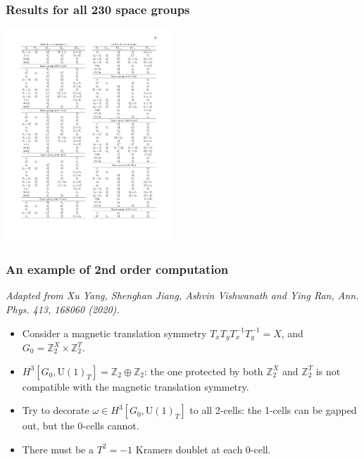 \documentclass[xcolor=table, 11pt, aspectratio=169]{beamer}
\newcommand{\uone}{\mathrm U(1)}
\begin{document}
  \begin{frame}
    \frametitle{Results for all 230 space groups}
    \begin{center}
      \includegraphics[height=8cm]{bigtable}
    \end{center}
  \end{frame}
  
  \begin{frame}
  \frametitle{An example of 2nd order computation}
  \emph{\small Adapted from Xu Yang, Shenghan Jiang, Ashvin Vishwanath and Ying Ran, Ann. Phys. 413, 168060 (2020).}
  \begin{itemize}
    \item Consider a magnetic translation symmetry $T_xT_yT_x^{-1}T_y^{-1} = X$, and $G_0=\mathbb Z_2^X\times\mathbb Z_2^T$.
    \item $H^3[G_0,\uone_T]=\mathbb Z_2\oplus\mathbb Z_2$: the one protected by both $\mathbb Z_2^X$ and $\mathbb Z_2^T$ is \alert{not compatible} with the magnetic translation symmetry.
    \item Try to decorate $\omega\in H^3[G_0,\uone_T]$ to all 2-cells: the 1-cells can be gapped out, but the 0-cells \alert{cannot}.
    \item There must be a $T^2=-1$ Kramers doublet at each 0-cell.
  \end{itemize}
  \begin{center}
  \end{center}
  \end{frame}
  
\end{document}
